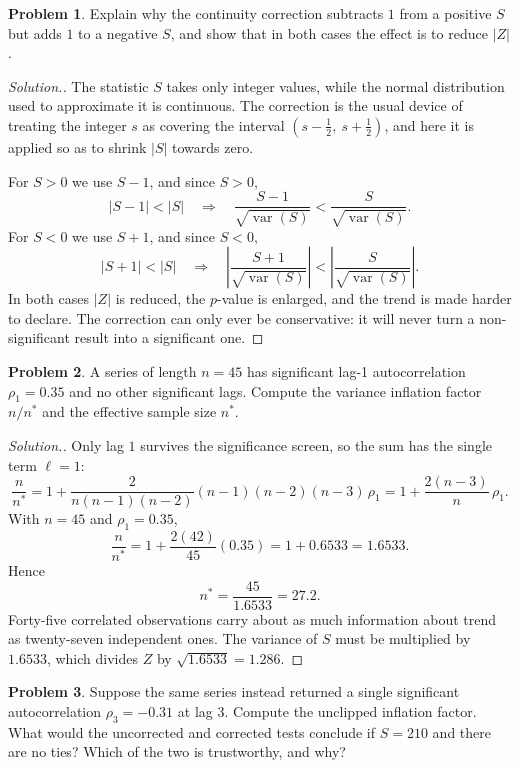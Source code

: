\documentclass[11pt,a4paper]{article}
\theoremstyle{definition}
\newtheorem{problemx}{Problem}[section]
\newenvironment{problem}{\begin{problemx}}{\end{problemx}}
\newenvironment{solution}
  {\renewcommand{\qedsymbol}{}\begin{proof}[\textit{Solution}.]}
  {\end{proof}}
\begin{document}
\begin{problem}
Explain why the continuity correction subtracts $1$ from a positive $S$ but adds
$1$ to a negative $S$, and show that in both cases the effect is to reduce
$\left|Z\right|$.
\end{problem}

\begin{solution}
The statistic $S$ takes only integer values, while the normal distribution used
to approximate it is continuous. The correction is the usual device of treating
the integer $s$ as covering the interval $\left(s - \tfrac12,\ s + \tfrac12\right)$,
and here it is applied so as to shrink $\left|S\right|$ towards zero.

For $S > 0$ we use $S - 1$, and since $S > 0$,
$$\left|S - 1\right| < \left|S\right| \quad\Longrightarrow\quad
\dfrac{S-1}{\sqrt{\operatorname{var}(S)}} < \dfrac{S}{\sqrt{\operatorname{var}(S)}} .$$
For $S < 0$ we use $S + 1$, and since $S < 0$,
$$\left|S + 1\right| < \left|S\right| \quad\Longrightarrow\quad
\left|\dfrac{S+1}{\sqrt{\operatorname{var}(S)}}\right|
< \left|\dfrac{S}{\sqrt{\operatorname{var}(S)}}\right| .$$
In both cases $\left|Z\right|$ is reduced, the $p$-value is enlarged, and the
trend is made harder to declare. The correction can only ever be conservative:
it will never turn a non-significant result into a significant one.
\end{solution}


\begin{problem}
A series of length $n = 45$ has significant lag-1 autocorrelation
$\rho_1 = 0.35$ and no other significant lags. Compute the variance inflation
factor $n/n^{*}$ and the effective sample size $n^{*}$.
\end{problem}

\begin{solution}
Only lag $1$ survives the significance screen, so the sum has the single term
$\ell = 1$:
$$\dfrac{n}{n^{*}} = 1 + \dfrac{2}{n(n-1)(n-2)}(n-1)(n-2)(n-3)\,\rho_1
= 1 + \dfrac{2(n-3)}{n}\,\rho_1 .$$
With $n = 45$ and $\rho_1 = 0.35$,
$$\dfrac{n}{n^{*}} = 1 + \dfrac{2(42)}{45}(0.35) = 1 + 0.6533 = 1.6533 .$$
Hence
$$n^{*} = \dfrac{45}{1.6533} = 27.2 .$$
Forty-five correlated observations carry about as much information about trend as
twenty-seven independent ones. The variance of $S$ must be multiplied by
$1.6533$, which divides $Z$ by $\sqrt{1.6533} = 1.286$.
\end{solution}


\begin{problem}
Suppose the same series instead returned a single significant autocorrelation
$\rho_3 = -0.31$ at lag $3$. Compute the unclipped inflation factor. What would
the uncorrected and corrected tests conclude if $S = 210$ and there are no ties?
Which of the two is trustworthy, and why?
\end{problem}
\end{document}
